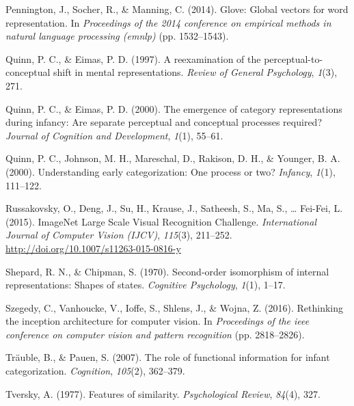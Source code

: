 \documentclass[10pt, letterpaper]{article}
\begin{document}
\hypertarget{ref-pennington2014glove}{}
Pennington, J., Socher, R., \& Manning, C. (2014). Glove: Global vectors
for word representation. In \emph{Proceedings of the 2014 conference on
empirical methods in natural language processing (emnlp)} (pp.
1532--1543).

\hypertarget{ref-quinn1997reexamination}{}
Quinn, P. C., \& Eimas, P. D. (1997). A reexamination of the
perceptual-to-conceptual shift in mental representations. \emph{Review
of General Psychology}, \emph{1}(3), 271.

\hypertarget{ref-quinn2000emergence}{}
Quinn, P. C., \& Eimas, P. D. (2000). The emergence of category
representations during infancy: Are separate perceptual and conceptual
processes required? \emph{Journal of Cognition and Development},
\emph{1}(1), 55--61.

\hypertarget{ref-quinn2000understanding}{}
Quinn, P. C., Johnson, M. H., Mareschal, D., Rakison, D. H., \& Younger,
B. A. (2000). Understanding early categorization: One process or two?
\emph{Infancy}, \emph{1}(1), 111--122.

\hypertarget{ref-ILSVRC15}{}
Russakovsky, O., Deng, J., Su, H., Krause, J., Satheesh, S., Ma, S.,
\ldots{} Fei-Fei, L. (2015). ImageNet Large Scale Visual Recognition
Challenge. \emph{International Journal of Computer Vision (IJCV)},
\emph{115}(3), 211--252. \url{http://doi.org/10.1007/s11263-015-0816-y}

\hypertarget{ref-shepard1970second}{}
Shepard, R. N., \& Chipman, S. (1970). Second-order isomorphism of
internal representations: Shapes of states. \emph{Cognitive Psychology},
\emph{1}(1), 1--17.

\hypertarget{ref-szegedy2016rethinking}{}
Szegedy, C., Vanhoucke, V., Ioffe, S., Shlens, J., \& Wojna, Z. (2016).
Rethinking the inception architecture for computer vision. In
\emph{Proceedings of the ieee conference on computer vision and pattern
recognition} (pp. 2818--2826).

\hypertarget{ref-trauble2007role}{}
Träuble, B., \& Pauen, S. (2007). The role of functional information for
infant categorization. \emph{Cognition}, \emph{105}(2), 362--379.

\hypertarget{ref-tversky1977features}{}
Tversky, A. (1977). Features of similarity. \emph{Psychological Review},
\emph{84}(4), 327.
\end{document}
